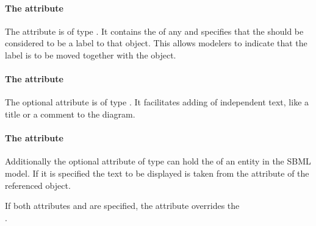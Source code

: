 \paragraph{The  attribute}
The attribute  is of type . It 
contains the  of any \GraphicalObject and specifies that the 
\TextGlyph should be considered to be a label to that object. This 
allows modelers to indicate that the label is to be moved together with the 
object. 

\paragraph{The  attribute}
The optional  attribute is of type . It 
facilitates adding of independent text, like a title or a comment to the 
diagram. 

\paragraph{The  attribute}
Additionally the optional attribute  of type 
 can hold the  of an entity in the SBML 
model. If it is specified the text to be displayed is taken from the 
 attribute of the referenced object. 

If both attributes  and  are specified, 
the  attribute overrides the \\ . 


